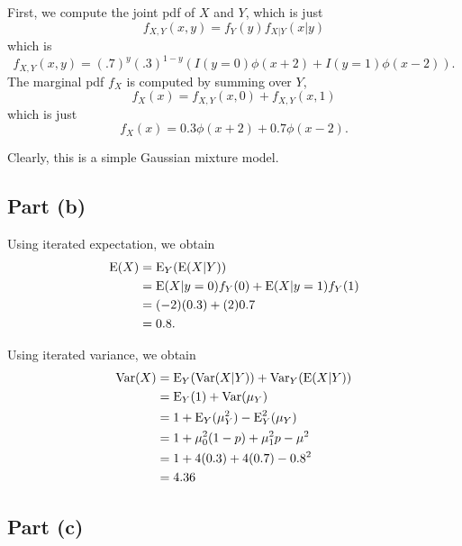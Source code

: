 \documentclass[
  12pt,
]{paper}
\begin{document}

First, we compute the joint pdf of \(X\) and \(Y\), which is just \[
  f_{X,Y}(x,y) = f_Y(y) f_{X|Y}(x|y)
\] which is \[
  f_{X,Y}(x,y) = (.7)^y(.3)^{1-y} \left(I(y=0) \phi(x+2) + I(y=1) \phi(x-2)\right).
\] The marginal pdf \(f_X\) is computed by summing over \(Y\), \[
  f_X(x) = f_{X,Y}(x,0) + f_{X,Y}(x,1)
\] which is just \[
  f_X(x) = 0.3 \phi(x+2) + 0.7 \phi(x-2).
\]

Clearly, this is a simple Gaussian mixture model.

\hypertarget{part-b-1}{%
\subsection{Part (b)}\label{part-b-1}}


Using iterated expectation, we obtain \begin{align}
  \operatorname{E}(X) &= \operatorname{E}_Y(\operatorname{E}(X|Y))\\
             &= \operatorname{E}(X|y=0)f_Y(0) + \operatorname{E}(X|y=1)f_Y(1)\\
             &= (-2)(0.3) + (2)0.7\\
             &= 0.8.
\end{align}

Using iterated variance, we obtain \begin{align}
  \operatorname{Var}(X) &= \operatorname{E}_Y(\operatorname{Var}(X|Y)) + \operatorname{Var}_Y(\operatorname{E}(X|Y))\\
          &= \operatorname{E}_Y(1) + \operatorname{Var}(\mu_Y)\\
          &= 1 + \operatorname{E}_Y(\mu_Y^2) - \operatorname{E}_Y^2(\mu_Y)\\
          &= 1 + \mu_0^2(1-p) + \mu_1^2 p - \mu^2\\
          &= 1 + 4(0.3) + 4(0.7) - 0.8^2\\
          &= 4.36\\
\end{align}

\hypertarget{part-c-1}{%
\subsection{Part (c)}\label{part-c-1}}
\end{document}
